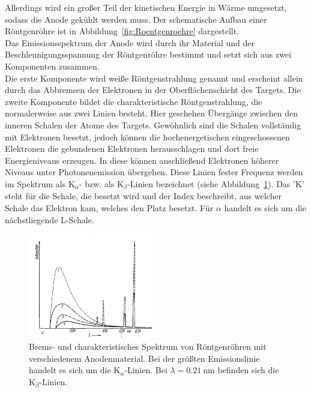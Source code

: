 \documentclass[a4paper,twoside,final]{article}
\begin{document}
Allerdings wird ein großer Teil der kinetischen Energie in Wärme umgesetzt, sodass die Anode gekühlt werden muss. Der schematische Aufbau einer Röntgenröhre ist in Abbildung~\ref{fig:Roentgenroehre} dargestellt.\\
Das Emissionsspektrum der Anode wird durch ihr Material und der Beschleunigungsspannung der Röntgenröhre bestimmt und setzt sich aus zwei Komponenten zusammen.\\
Die erste Komponente wird \glqq{}weiße Röntgenstrahlung\grqq{} genannt und erscheint allein durch das Abbremsen der Elektronen in der Oberflächenschicht des Targets. Die zweite Komponente bildet die charakteristische Röntgenstrahlung, die normalerweise aus zwei Linien besteht. Hier geschehen Übergänge zwischen den inneren Schalen der Atome des Targets. Gewöhnlich sind die Schalen vollständig mit Elektronen besetzt, jedoch können die hochenergetischen eingeschossenen Elektronen die gebundenen Elektronen herausschlagen und dort freie Energieniveaus erzeugen. In diese können anschließend Elektronen höherer Niveaus unter Photonenemission übergehen. Diese Linien fester Frequenz werden im Spektrum als K$_\alpha$- bzw. als K$_\beta$-Linien bezeichnet (siehe Abbildung~\ref{fig:Roentgenspektrum}). Das 'K' steht für die Schale, die besetzt wird und der Index beschreibt, aus welcher Schale das Elektron kam, welches den Platz besetzt. Für $\alpha$ handelt es sich um die nächstliegende L-Schale.\vspace{-5mm}
\begin{figure}[htp]
    \centering
    \includegraphics[width=0.5\textwidth]{Abbildungen/Roentgenspektrum.pdf}
    \caption{Brems- und charakteristisches Spektrum von Röntgenröhren mit verschiedenem Anodenmaterial. Bei der größten Emissionslinie handelt es sich um die K$_\alpha$-Linien. Bei $\lambda =\SI{0,21}{\nano\metre}$ befinden sich die K$_\beta$-Linien.~\cite[S.361]{Kleber}}
    \label{fig:Roentgenspektrum}
\end{figure}\\
\end{document}
